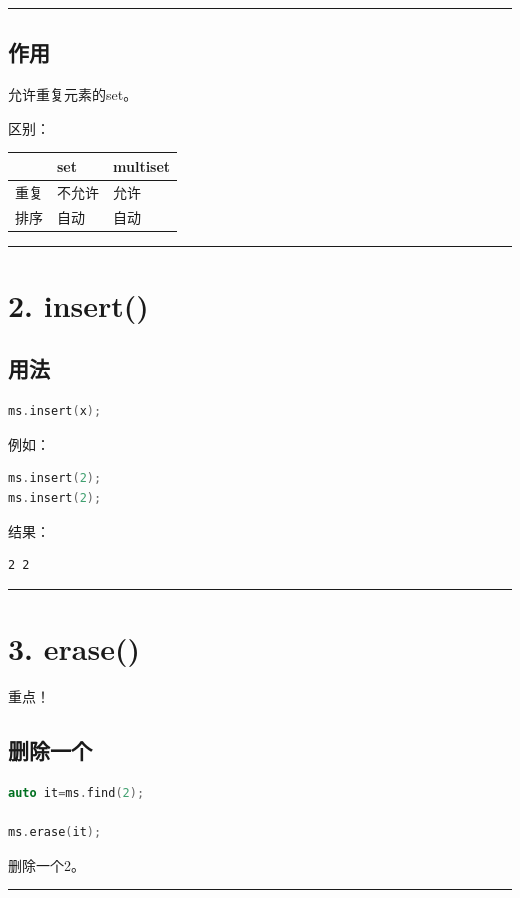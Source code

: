 \documentclass[9pt,twocolumn]{extarticle}
\begin{document}
\noindent\rule{\linewidth}{0.4pt}

\subsection{作用}
允许重复元素的set。

区别：
\begin{table}[h]
\centering
\begin{tabular}{|l|l|l|}
\hline
 & set & multiset \\ \hline
重复 & 不允许 & 允许 \\ \hline
排序 & 自动 & 自动 \\ \hline
\end{tabular}
\end{table}

\noindent\rule{\linewidth}{0.4pt}

\section{2. insert()}

\subsection{用法}
\begin{lstlisting}[language=C++]
ms.insert(x);
\end{lstlisting}
例如：
\begin{lstlisting}[language=C++]
ms.insert(2);
ms.insert(2);
\end{lstlisting}
结果：
\begin{lstlisting}
2 2
\end{lstlisting}

\noindent\rule{\linewidth}{0.4pt}

\section{3. erase()}

重点！

\subsection{删除一个}
\begin{lstlisting}[language=C++]
auto it=ms.find(2);

ms.erase(it);
\end{lstlisting}
删除一个2。

\noindent\rule{\linewidth}{0.4pt}
\end{document}
